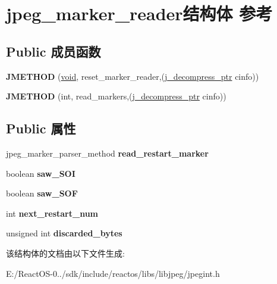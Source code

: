 \hypertarget{structjpeg__marker__reader}{}\section{jpeg\+\_\+marker\+\_\+reader结构体 参考}
\label{structjpeg__marker__reader}
\subsection*{Public 成员函数}
\begin{DoxyCompactItemize}
\item 
\mbox{\label{structjpeg__marker__reader_af23250da87f9da190c88459aa565f2b1}} 
{\bfseries J\+M\+E\+T\+H\+OD} (\hyperlink{interfacevoid}{void}, reset\+\_\+marker\+\_\+reader,(\hyperlink{structjpeg__decompress__struct}{j\+\_\+decompress\+\_\+ptr} cinfo))
\item 
\mbox{\label{structjpeg__marker__reader_a6a2541cbeb37477c71ba6bc237e559a1}} 
{\bfseries J\+M\+E\+T\+H\+OD} (int, read\+\_\+markers,(\hyperlink{structjpeg__decompress__struct}{j\+\_\+decompress\+\_\+ptr} cinfo))
\end{DoxyCompactItemize}
\subsection*{Public 属性}
\begin{DoxyCompactItemize}
\item 
\mbox{\label{structjpeg__marker__reader_a23e67f5a0fa37ea69483dad72217123e}} 
jpeg\+\_\+marker\+\_\+parser\+\_\+method {\bfseries read\+\_\+restart\+\_\+marker}
\item 
\mbox{\label{structjpeg__marker__reader_ad67711d91054e97e76fbe5254aac644c}} 
boolean {\bfseries saw\+\_\+\+S\+OI}
\item 
\mbox{\label{structjpeg__marker__reader_a1bf77ef7dfb6dfe58a03d041eb0dcd40}} 
boolean {\bfseries saw\+\_\+\+S\+OF}
\item 
\mbox{\label{structjpeg__marker__reader_aac8d40171c73a18f129cd1b62d2fd06b}} 
int {\bfseries next\+\_\+restart\+\_\+num}
\item 
\mbox{\label{structjpeg__marker__reader_ad29dee6159ab74f195fe5d88139306ce}} 
unsigned int {\bfseries discarded\+\_\+bytes}
\end{DoxyCompactItemize}


该结构体的文档由以下文件生成\+:\begin{DoxyCompactItemize}
\item 
E\+:/\+React\+O\+S-\/0../sdk/include/reactos/libs/libjpeg/jpegint.\+h\end{DoxyCompactItemize}
